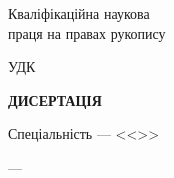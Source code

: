 \thispagestyle{empty}%
\begin{center}%
\thesisOrganization

\thesisMON

\thesisOrganization

\thesisMON

\end{center}%

\vspace{0pt plus4fill} %
\begin{flushright}%
  \begin{minipage}[b]{0.4\linewidth}
    \begin{flushleft}%
Кваліфікаційна наукова \\
праця на правах рукопису
    \end{flushleft}%
  \end{minipage}
\end{flushright}%

\vspace{0pt plus3fill} %
\begin{center}%
{\textbf{\MakeUppercase{\thesisAuthor}} }
\end{center}%

\vspace{0pt plus1fill} %
\begin{flushright}%
  \begin{minipage}[b]{0.4\linewidth}
    \begin{flushleft}%
       УДК \thesisUdk
    \end{flushleft}%
  \end{minipage}
\end{flushright}%

\vspace{0pt plus1fill} %
\begin{center}%
{\textbf{ДИСЕРТАЦІЯ} }
\end{center}%
%

\vspace{0pt plus1fill} %
\begin{center}%
\MakeUppercase{
\thesisTitle}

\vspace{0pt plus4fill} %
{%
Спеціальність \thesisSpecialtyNumber ---
<<\thesisSpecialtyTitle>>

\thesisKnowledgeNumber ---
\thesisKnowledgeTitle
}
\end{center}%

